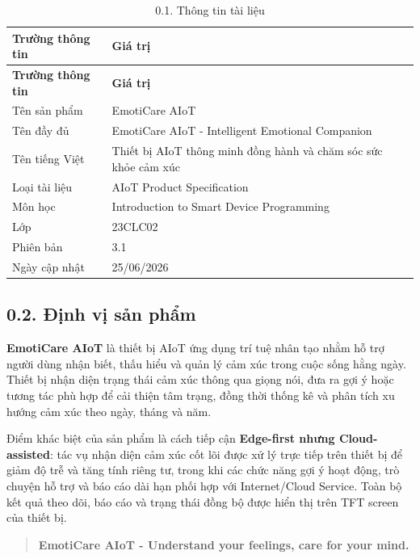 \documentclass[12pt,a4paper]{article}
\begin{document}
\begin{center}
\begin{longtable}{|P{0.30\textwidth}|P{0.62\textwidth}|}
\caption{0.1. Thông tin tài liệu}\\
\hline
\textbf{Trường thông tin} & \textbf{Giá trị} \\
\hline
\endfirsthead
\hline
\textbf{Trường thông tin} & \textbf{Giá trị} \\
\hline
\endhead
Tên sản phẩm & EmotiCare AIoT \\
\hline
Tên đầy đủ & EmotiCare AIoT - Intelligent Emotional Companion \\
\hline
Tên tiếng Việt & Thiết bị AIoT thông minh đồng hành và chăm sóc sức khỏe cảm xúc \\
\hline
Loại tài liệu & AIoT Product Specification \\
\hline
Môn học & Introduction to Smart Device Programming \\
\hline
Lớp & 23CLC02 \\
\hline
Phiên bản & 3.1 \\
\hline
Ngày cập nhật & 25/06/2026 \\
\hline
\end{longtable}
\end{center}

\subsection*{0.2. Định vị sản phẩm}

\textbf{EmotiCare AIoT} là thiết bị AIoT ứng dụng trí tuệ nhân tạo nhằm hỗ trợ người dùng nhận biết, thấu hiểu và quản lý cảm xúc trong cuộc sống hằng ngày. Thiết bị nhận diện trạng thái cảm xúc thông qua giọng nói, đưa ra gợi ý hoặc tương tác phù hợp để cải thiện tâm trạng, đồng thời thống kê và phân tích xu hướng cảm xúc theo ngày, tháng và năm.


Điểm khác biệt của sản phẩm là cách tiếp cận \textbf{Edge-first nhưng Cloud-assisted}: tác vụ nhận diện cảm xúc cốt lõi được xử lý trực tiếp trên thiết bị để giảm độ trễ và tăng tính riêng tư, trong khi các chức năng gợi ý hoạt động, trò chuyện hỗ trợ và báo cáo dài hạn phối hợp với Internet/Cloud Service. Toàn bộ kết quả theo dõi, báo cáo và trạng thái đồng bộ được hiển thị trên TFT screen của thiết bị.


\begin{quote}
\textbf{EmotiCare AIoT - Understand your feelings, care for your mind.}
\end{quote}
\end{document}
